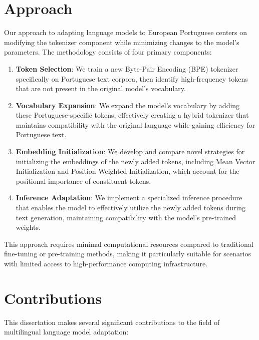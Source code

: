 \section{Approach}\label{Section1.3}
Our approach to adapting language models to European Portuguese centers on modifying the tokenizer component while minimizing changes to the model's parameters. The methodology consists of four primary components:

\begin{enumerate}
    \item \textbf{Token Selection}: We train a new Byte-Pair Encoding (BPE) tokenizer specifically on Portuguese text corpora, then identify high-frequency tokens that are not present in the original model's vocabulary.
    
    \item \textbf{Vocabulary Expansion}: We expand the model's vocabulary by adding these Portuguese-specific tokens, effectively creating a hybrid tokenizer that maintains compatibility with the original language while gaining efficiency for Portuguese text.
    
    \item \textbf{Embedding Initialization}: We develop and compare novel strategies for initializing the embeddings of the newly added tokens, including Mean Vector Initialization and Position-Weighted Initialization, which account for the positional importance of constituent tokens.
    
    \item \textbf{Inference Adaptation}: We implement a specialized inference procedure that enables the model to effectively utilize the newly added tokens during text generation, maintaining compatibility with the model's pre-trained weights.
\end{enumerate}

This approach requires minimal computational resources compared to traditional fine-tuning or pre-training methods, making it particularly suitable for scenarios with limited access to high-performance computing infrastructure.

\section{Contributions}\label{Section1.4}
This dissertation makes several significant contributions to the field of multilingual language model adaptation:

